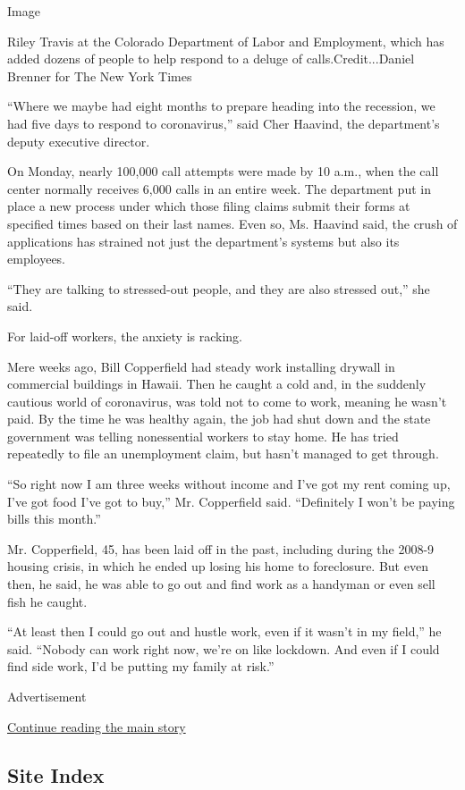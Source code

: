 Image

Riley Travis at the Colorado Department of Labor and Employment, which
has added dozens of people to help respond to a deluge of
calls.Credit...Daniel Brenner for The New York Times

``Where we maybe had eight months to prepare heading into the recession,
we had five days to respond to coronavirus,'' said Cher Haavind, the
department's deputy executive director.

On Monday, nearly 100,000 call attempts were made by 10 a.m., when the
call center normally receives 6,000 calls in an entire week. The
department put in place a new process under which those filing claims
submit their forms at specified times based on their last names. Even
so, Ms. Haavind said, the crush of applications has strained not just
the department's systems but also its employees.

``They are talking to stressed-out people, and they are also stressed
out,'' she said.

For laid-off workers, the anxiety is racking.

Mere weeks ago, Bill Copperfield had steady work installing drywall in
commercial buildings in Hawaii. Then he caught a cold and, in the
suddenly cautious world of coronavirus, was told not to come to work,
meaning he wasn't paid. By the time he was healthy again, the job had
shut down and the state government was telling nonessential workers to
stay home. He has tried repeatedly to file an unemployment claim, but
hasn't managed to get through.

``So right now I am three weeks without income and I've got my rent
coming up, I've got food I've got to buy,'' Mr. Copperfield said.
``Definitely I won't be paying bills this month.''

Mr. Copperfield, 45, has been laid off in the past, including during the
2008-9 housing crisis, in which he ended up losing his home to
foreclosure. But even then, he said, he was able to go out and find work
as a handyman or even sell fish he caught.

``At least then I could go out and hustle work, even if it wasn't in my
field,'' he said. ``Nobody can work right now, we're on like lockdown.
And even if I could find side work, I'd be putting my family at risk.''

Advertisement

\protect\hyperlink{after-bottom}{Continue reading the main story}

\hypertarget{site-index}{%
\subsection{Site Index}\label{site-index}}

